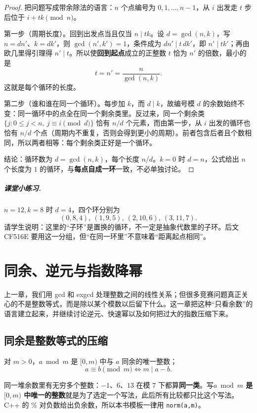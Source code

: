 \documentclass[UTF8,a4paper,11pt,twoside,openright,fontset=fandol]{ctexbook}
\theoremstyle{definition}
\begin{document}
\begin{proof}
把问题写成带余除法的语言：$n$ 个点编号为 $0,1,\ldots,n-1$，从 $i$ 出发走 $t$ 步后位于 $i+tk\pmod n$。

第一步（周期长度）。回到出发点当且仅当 $n\mid tk$。设 $d=\gcd(n,k)$，写 $n=dn'$、$k=dk'$，则 $\gcd(n',k')=1$，条件成为 $dn'\mid t\,dk'$，即 $n'\mid tk'$；再由欧几里得引理得 $n'\mid t$。所以使\textbf{回到起点}成立的正整数 $t$ 恰为 $n'$ 的倍数，最小的是
\[
 t=n'=\frac{n}{\gcd(n,k)}.
\]
这就是每个循环的长度。

第二步（谁和谁在同一个循环）。每步加 $k$，而 $d\mid k$，故编号模 $d$ 的余数始终不变：同一循环中的点全在同一个剩余类里。反过来，同一个剩余类 $\{j:0\le j<n,\ j\equiv i\pmod d\}$ 恰有 $n/d$ 个元素，而由第一步，从 $i$ 出发的循环也恰有 $n/d$ 个点（周期内不重复，否则会得到更小的周期）。前者包含后者且个数相同，所以两者相等：每个剩余类正好是一个循环。

结论：循环数为 $d=\gcd(n,k)$，每个长度 $n/d$。$k=0$ 时 $d=n$，公式给出 $n$ 个长度为 $1$ 的循环，与\textbf{每点自成一环}一致，不必单独讨论。
\end{proof}

\paragraph{课堂小练习.} $n=12,k=8$ 时 $d=4$，四个环分别为
\[
 (0,8,4),\ (1,9,5),\ (2,10,6),\ (3,11,7).
\]
请学生说明：这里的“子环”是置换的循环，不一定是抽象代数里的子环。后文 CF516E 要用这一分组，但“在同一环里”不意味着“距离起点相同”。



\chapter{同余、逆元与指数降幂}
\begin{chapterintro}[章节导读]
上一章，我们用 gcd 和 exgcd 处理整数之间的线性关系；但很多竞赛问题真正关心的不是整数等式，而是除以某个模数以后留下什么。这一章把这种“只看余数”的语言建立起来，并继续讨论逆元、快速幂以及如何把过大的指数压缩下来。
\end{chapterintro}

\section{同余是整数等式的压缩}
对 $m>0$，$a\bmod m$ 是 $[0,m)$ 中与 $a$ 同余的唯一整数；
\[
 a\equiv b\pmod m\iff m\mid a-b.
\]

\begin{tip}
同一堆余数里有无穷多个整数：$-1$、$6$、$13$ 在模 $7$ 下都算\textbf{同一类}。写\textbf{$a\bmod m$ 是 $[0,m)$ 中唯一的整数}就是为了选定一个写法，此后所有比较都只比这个写法。C++ 的 \% 对负数给出负余数，所以本书模板一律用 \texttt{norm(a,m)}。
\end{tip}
\end{document}
